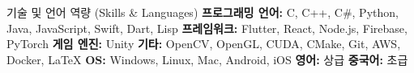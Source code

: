 \begin{rubric}{기술 및 언어 역량 (Skills \& Languages)}
     \textbf{프로그래밍 언어: } C, C++, C\#, Python, Java, JavaScript, Swift, Dart, Lisp
     \textbf{프레임워크:} Flutter, React, Node.js, Firebase, PyTorch
     \textbf{게임 엔진:} Unity
     \textbf{기타:} OpenCV, OpenGL, CUDA, CMake, Git, AWS, Docker, \LaTeX
     \textbf{OS:} Windows, Linux, Mac, Android, iOS
    \entry*[Languages] \textbf{영어: } 상급
    \entry*[Languages] \textbf{중국어: } 초급
\end{rubric}